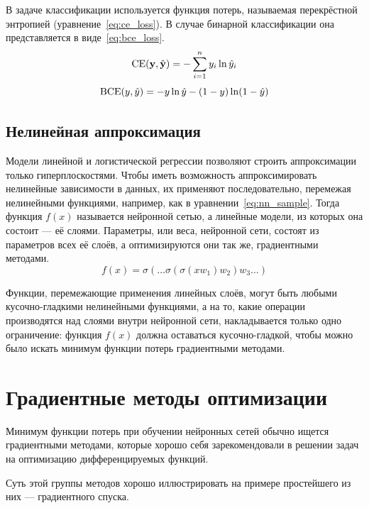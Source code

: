 В задаче классификации используется функция потерь, называемая перекрёстной энтропией (уравнение \ref*{eq:ce_loss}). В случае бинарной классификации она представляется в виде \ref*{eq:bce_loss}.
\begin{equation}
    \label{eq:ce_loss}
    \operatorname{CE}(\mathbf{y},\hat{\mathbf{y}})=-\sum\limits_{i=1}^n y_i \ln \hat{y}_i
\end{equation}
\begin{equation}
    \label{eq:bce_loss}
    \operatorname{BCE}(y,\hat{y})=-y \ln \hat{y} - (1-y)\ln (1-\hat{y})
\end{equation}

\subsection{Нелинейная аппроксимация}

Модели линейной и логистической регрессии позволяют строить аппроксимации только гиперплоскостями. Чтобы иметь возможность аппроксимировать нелинейные зависимости в данных, их применяют последовательно, перемежая нелинейными функциями, например, как в уравнении \ref*{eq:nn_sample}. Тогда функция $f(x)$ называется нейронной сетью, а линейные модели, из которых она состоит --- её слоями. Параметры, или веса, нейронной сети, состоят из параметров всех её слоёв, а оптимизируются они так же, градиентными методами.
\begin{equation}
    \label{eq:nn_sample}
    f(x)=\sigma(\dots \sigma(\sigma(xw_1)w_2)w_3 \dots)
\end{equation}

Функции, перемежающие применения линейных слоёв, могут быть любыми кусочно-гладкими нелинейными функциями, а на то, какие операции производятся над слоями внутри нейронной сети, накладывается только одно ограничение: функция $f(x)$ должна оставаться кусочно-гладкой, чтобы можно было искать минимум функции потерь градиентными методами.

\section{Градиентные методы оптимизации}

Минимум функции потерь при обучении нейронных сетей обычно ищется градиентными методами, которые хорошо себя зарекомендовали в решении задач на оптимизацию дифференцируемых функций.

Суть этой группы методов хорошо иллюстрировать на примере простейшего из них --- градиентного спуска.

